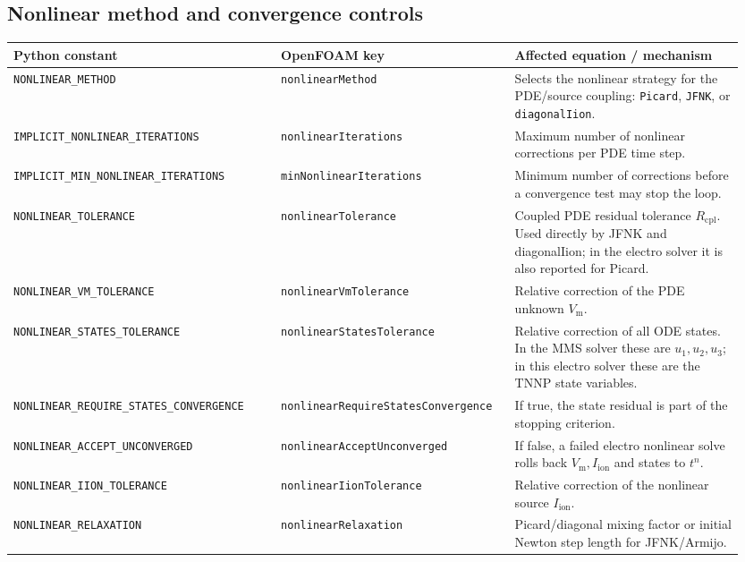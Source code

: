 \documentclass[11pt,a4paper]{article}
\newcommand{\code}[1]{\texttt{\small #1}}
\newcommand{\Vm}{V_{\text{m}}}
\newcommand{\Iion}{I_{\mathrm{ion}}}
\begin{document}
\subsection{Nonlinear method and convergence controls}
\begin{longtable}{@{}p{0.35\linewidth}p{0.30\linewidth}p{0.30\linewidth}@{}}
\toprule
Python constant & OpenFOAM key & Affected equation / mechanism \\
\midrule \endhead
\code{NONLINEAR\_METHOD} & \code{nonlinearMethod} &
   Selects the nonlinear strategy for the PDE/source coupling:
   \code{Picard}, \code{JFNK}, or \code{diagonalIion}. \\
\code{IMPLICIT\_NONLINEAR\_ITERATIONS} & \code{nonlinearIterations} &
   Maximum number of nonlinear corrections per PDE time step. \\
\code{IMPLICIT\_MIN\_NONLINEAR\_ITERATIONS} &
   \code{minNonlinearIterations} &
   Minimum number of corrections before a convergence test may stop the
   loop. \\
\code{NONLINEAR\_TOLERANCE} & \code{nonlinearTolerance} &
   Coupled PDE residual tolerance $R_{\mathrm{cpl}}$. Used directly by
   JFNK and diagonalIion; in the electro solver it is also reported for
   Picard. \\
\code{NONLINEAR\_VM\_TOLERANCE} & \code{nonlinearVmTolerance} &
   Relative correction of the PDE unknown $\Vm$. \\
\code{NONLINEAR\_STATES\_TOLERANCE} &
   \code{nonlinearStatesTolerance} &
   Relative correction of all ODE states. In the MMS solver these are
   $u_1,u_2,u_3$; in this electro solver these are the TNNP state
   variables. \\
\code{NONLINEAR\_REQUIRE\_STATES\_CONVERGENCE} &
   \code{nonlinearRequireStatesConvergence} &
   If true, the state residual is part of the stopping criterion. \\
\code{NONLINEAR\_ACCEPT\_UNCONVERGED} &
   \code{nonlinearAcceptUnconverged} &
   If false, a failed electro nonlinear solve rolls back $\Vm,\Iion$ and
   states to $t^n$. \\
\code{NONLINEAR\_IION\_TOLERANCE} & \code{nonlinearIionTolerance} &
   Relative correction of the nonlinear source $\Iion$. \\
\code{NONLINEAR\_RELAXATION} & \code{nonlinearRelaxation} &
   Picard/diagonal mixing factor or initial Newton step length for
   JFNK/Armijo. \\
\bottomrule
\end{longtable}
\end{document}
